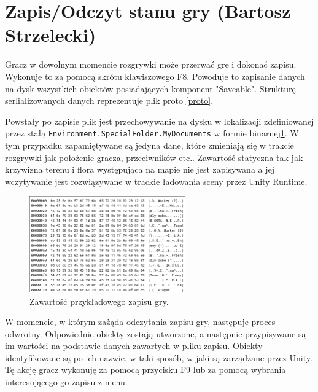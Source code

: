 \section{Zapis/Odczyt stanu gry (Bartosz Strzelecki)}

Gracz w dowolnym momencie rozgrywki może przerwać grę i dokonać zapisu. Wykonuje to
za pomocą skrótu klawiszowego F8. Powoduje to zapisanie danych na dysk wszystkich obiektów posiadających
komponent "Saveable". Strukturę serlializowanych danych reprezentuje plik proto \ref{proto}.


Powstały po zapisie plik jest przechowywanie na dysku w lokalizacji zdefiniowanej przez stałą \verb|Environment.SpecialFolder.MyDocuments| w formie binarnej\ref{save}.
W tym przypadku zapamiętywane są jedyna dane, które zmieniają się w trakcie rozgrywki jak położenie gracza, przeciwników etc.. 
Zawartość statyczna tak jak krzywizna terenu i flora występująca na mapie nie jest zapisywana a jej wczytywanie jest rozwiązywane
w trackie ładowania sceny przez Unity Runtime.

\begin{figure}[h]
\centering
\includegraphics[width=0.6\textwidth]{images/save}
\caption{Zawartość przykładowego zapisu gry.}
\label{save}
\end{figure}

W momencie, w którym zażąda odczytania zapisu gry, następuje proces odwrotny. Odpowiednie obiekty zostają utworzone,
a następnie przypisywane są im wartości na podstawie danych zawartych w pliku zapisu. Obiekty identyfikowane
są po ich nazwie, w taki sposób, w jaki są zarządzane przez Unity.
Tę akcję gracz wykonuję za pomocą przycisku F9 lub za pomocą wybrania interesującego go zapisu z menu.

